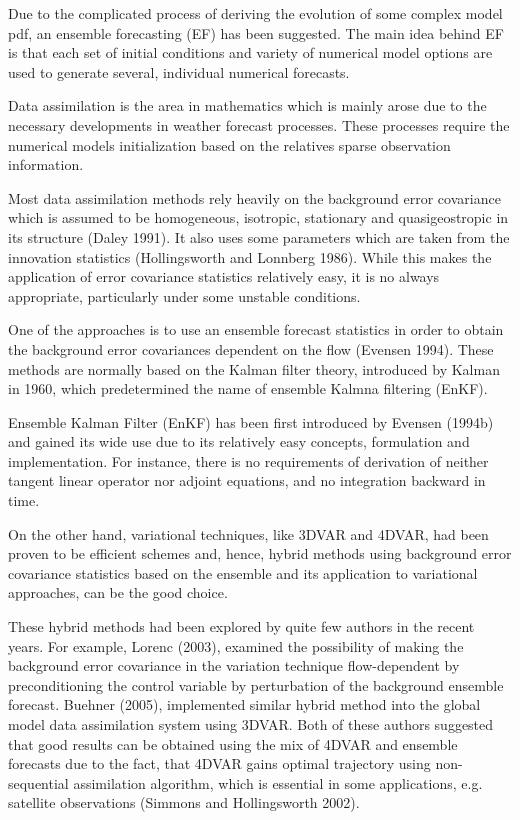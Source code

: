 \documentclass[a4,12pt]{article}
\numberwithin{equation}{section}
\begin{document}
Due to the complicated process of deriving the evolution of some complex model pdf, an ensemble forecasting (EF) has been suggested. The main idea behind EF is that each set of initial conditions and variety of numerical model options are used to generate several, individual numerical forecasts.

Data assimilation is the area in mathematics which is mainly arose due to the necessary developments in weather forecast processes. These processes require the numerical models initialization based on the relatives sparse observation information.  

Most data assimilation methods rely heavily on the background error covariance which is assumed to be homogeneous, isotropic, stationary and quasigeostropic in its structure (Daley 1991). It also uses some parameters which are taken from the innovation statistics (Hollingsworth and
Lonnberg 1986). While this makes the application of error covariance statistics relatively easy, it is no always appropriate, particularly under some unstable conditions.

One of the approaches is to use an ensemble forecast statistics in order to obtain the background error covariances dependent on the flow (Evensen 1994). These methods are normally based on the Kalman filter theory, introduced by Kalman in 1960, which predetermined the name of ensemble Kalmna filtering (EnKF).

Ensemble Kalman Filter (EnKF) has been first introduced by Evensen (1994b) and gained its wide use due to its relatively easy concepts, formulation and implementation. For instance, there is no requirements of derivation of neither tangent linear operator nor adjoint equations, and no integration backward in time.

On the other hand, variational techniques, like 3DVAR and 4DVAR, had been proven to be efficient schemes and, hence, hybrid methods using background error covariance statistics based on the ensemble and its application to variational approaches, can be the good choice.

These hybrid methods had been explored by quite few authors in the recent years. For example, Lorenc (2003), examined the possibility of making the background error covariance in the variation technique flow-dependent by preconditioning the control variable by perturbation of the background ensemble forecast.  Buehner (2005), implemented similar hybrid method into the global model data assimilation system using 3DVAR. Both of these authors suggested that good results can be obtained using the mix of 4DVAR and ensemble forecasts due to the fact, that 4DVAR gains optimal trajectory using non-sequential assimilation algorithm, which is essential in some applications, e.g. satellite observations (Simmons and
Hollingsworth 2002). 
\end{document}
